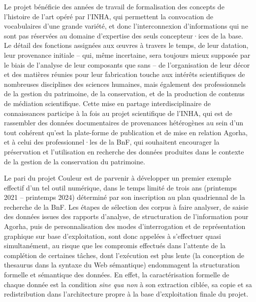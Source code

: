\documentclass[a4paper,12pt, twoside]{book}
\begin{document}
Le projet bénéficie des années de travail de formalisation des concepts de l’histoire de l’art opéré par l’INHA, qui permettent la convocation de vocabulaires d’une grande variété, et donc l’interconnexion d’informations qui ne sont pas réservées au domaine d’expertise des seuls concepteur·ices de la base. Le détail des fonctions assignées aux œuvres à travers le temps, de leur datation, leur provenance initiale – qui, même incertaine, sera toujours mieux supposée par le biais de l’analyse de leur composants que sans – de l’organisation de leur décor et des matières réunies pour leur fabrication touche aux intérêts scientifiques de nombreuses disciplines des sciences humaines, mais également des professionnels de la gestion du patrimoine, de la conservation, et de la production de contenus de médiation scientifique. Cette mise en partage interdisciplinaire de connaissances participe à la fois au projet scientifique de l’INHA, qui est de rassembler des données documentaires de provenances hétérogènes au sein d’un tout cohérent qu’est la plate-forme de publication et de mise en relation Agorha, et à celui des professionnel·les de la BnF, qui souhaitent encourager la préservation et l’utilisation en recherche des données produites dans le contexte de la gestion de la conservation du patrimoine.

Le pari du projet Couleur est de parvenir à développer un premier exemple effectif d’un tel outil numérique, dans le temps limité de trois ans (printemps 2021 – printemps 2024) déterminé par son inscription au plan quadriennal de la recherche de la BnF. Les étapes de sélection des corpus à faire analyser, de saisie des données issues des rapports d’analyse, de structuration de l’information pour Agorha, puis de personnalisation des modes d’interrogation et de représentation graphique sur base d’exploitation, sont donc appelées à s’effectuer quasi simultanément, au risque que les compromis effectués dans l’attente de la complétion de certaines tâches, dont l’exécution est plus lente (la conception de thesaurus dans la syntaxe du Web sémantique) endommagent la structuration formelle et sémantique des données. En effet, la caractérisation formelle de chaque donnée est la condition \textit{sine qua non} à son extraction ciblée, sa copie et sa redistribution dans l’architecture propre à la base d’exploitation finale du projet.
\end{document}
